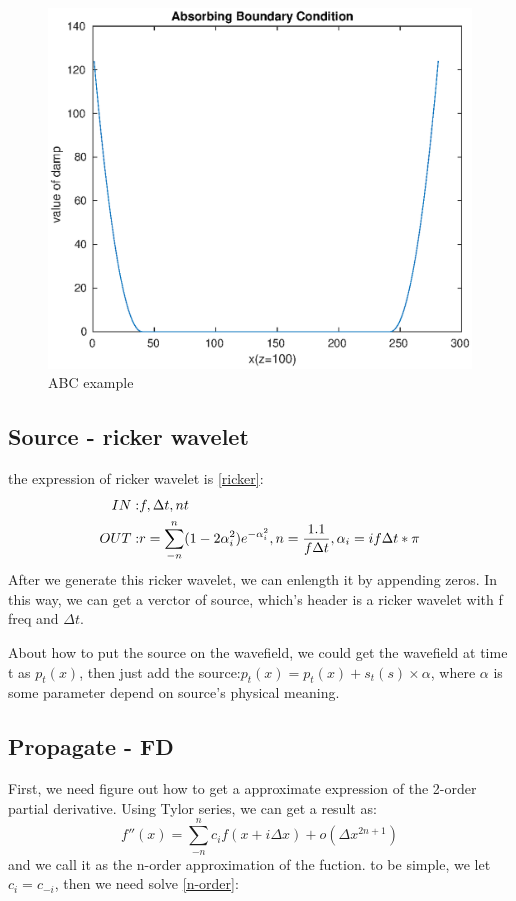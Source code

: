 \documentclass[a4paper]{article}
\begin{document}
		\begin{figure}
			\centering
			\includegraphics[width=0.5\linewidth]{fig/ABC.eps}
			\caption{ABC example}
			\label{ABCfigure}
		\end{figure}

	\subsection{Source - ricker wavelet}
		the expression of ricker wavelet is \autoref{ricker}:
		\begin{equation}
			\begin{aligned}
				IN: & f, \Delta t, nt\\
				OUT:& r = \sum_{-n}^{n}(1-2\alpha_i^2 )e^{- \alpha_i^2 }, n = \frac{1.1}{f\Delta t}, \alpha_i = if\Delta t * \pi
			\end{aligned}
			\label{ricker}
			\centering
		\end{equation}
		After we generate this ricker wavelet, we can enlength it by appending zeros. In this way, we can get a verctor of source, which's header is a ricker wavelet with f freq and $\Delta t$.\par

		About how to put the source on the wavefield, we could get the wavefield at time t as $p_t(x)$, then just add the source:$p_t(x)=p_t(x)+s_t(s)\times \alpha$, where $\alpha$ is some parameter depend on source's physical meaning.
	
	\subsection{Propagate - FD}

		First, we need figure out how to get a approximate expression of the 2-order partial derivative. Using Tylor series, we can get a result as:
			$$f''(x)=\sum_{-n}^{n}c_{i}f(x+i\Delta x) + o(\Delta x ^{2n+1})$$
		and we call it as the n-order approximation of the fuction. to be simple, we let $c_i=c_{-i}$, then we need solve \autoref{n-order}:
\end{document}
